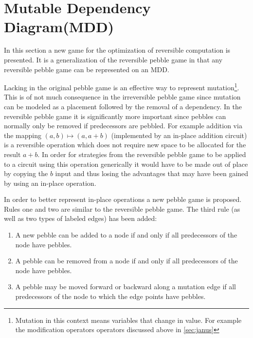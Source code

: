 \section{Mutable Dependency Diagram(MDD)}

In this section a new game for the optimization of reversible computation is
presented. It is a generalization of the reversible pebble game in that any
reversible pebble game can be represented on an MDD. 

Lacking in the original pebble game is an effective way to represent
mutation\footnote{Mutation in this context means variables that change in
value. For example the modification operators operators discussed above in
\cref{sec:janus}}. This is of not much consequence in the irreversible pebble
game since mutation can be modeled as a placement followed by the removal of a
dependency. In the reversible pebble game it is significantly more important
since pebbles can normally only be removed if predecessors are pebbled. For
example addition via the mapping $(a,b) \mapsto (a,a+b)$ (implemented by an
in-place addition circuit) is a reversible operation which does not require new
space to be allocated for the result $a+b$.  In order for strategies from the
reversible pebble game to be applied to a circuit using this operation
generically it would have to be made out of place by copying the $b$ input and
thus losing the advantages that may have been gained by using an in-place
operation.

In order to better represent in-place operations a new pebble game is proposed.
Rules one and two are similar to the reversible pebble game. The third rule
(as well as two types of labeled edges) has been added:

\begin{enumerate}

   \item A new pebble can be added to a node if and only if all predecessors of
     the node have pebbles.

   \item A pebble can be removed from a node if and only if all predecessors of
     the node have pebbles.

   \item A pebble may be moved forward or backward along a mutation edge if all
     predecessors of the node to which the edge points have pebbles.

\end{enumerate}

